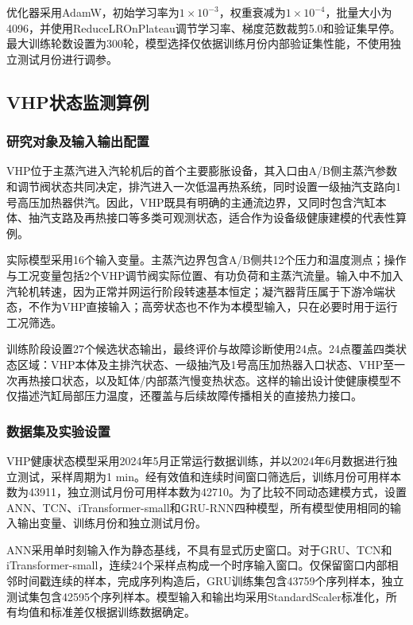 优化器采用AdamW，初始学习率为$1\times10^{-3}$，权重衰减为$1\times10^{-4}$，批量大小为4096，并使用ReduceLROnPlateau调节学习率、梯度范数裁剪5.0和验证集早停。最大训练轮数设置为300轮，模型选择仅依据训练月份内部验证集性能，不使用独立测试月份进行调参。

\subsection{VHP状态监测算例}
\label{subsec:vhp_case_v4}

\subsubsection{研究对象及输入输出配置}

VHP位于主蒸汽进入汽轮机后的首个主要膨胀设备，其入口由A/B侧主蒸汽参数和调节阀状态共同决定，排汽进入一次低温再热系统，同时设置一级抽汽支路向1号高压加热器供汽。因此，VHP既具有明确的主通流边界，又同时包含汽缸本体、抽汽支路及再热接口等多类可观测状态，适合作为设备级健康建模的代表性算例。

实际模型采用16个输入变量。主蒸汽边界包含A/B侧共12个压力和温度测点；操作与工况变量包括2个VHP调节阀实际位置、有功负荷和主蒸汽流量。输入中不加入汽轮机转速，因为正常并网运行阶段转速基本恒定；凝汽器背压属于下游冷端状态，不作为VHP直接输入；高旁状态也不作为本模型输入，只在必要时用于运行工况筛选。

训练阶段设置27个候选状态输出，最终评价与故障诊断使用24点。24点覆盖四类状态区域：VHP本体及主排汽状态、一级抽汽及1号高压加热器入口状态、VHP至一次再热接口状态，以及缸体/内部蒸汽慢变热状态。这样的输出设计使健康模型不仅描述汽缸局部压力温度，还覆盖与后续故障传播相关的直接热力接口。

\subsubsection{数据集及实验设置}

VHP健康状态模型采用2024年5月正常运行数据训练，并以2024年6月数据进行独立测试，采样周期为1 min。经有效值和连续时间窗口筛选后，训练月份可用样本数为43911，独立测试月份可用样本数为42710。为了比较不同动态建模方式，设置ANN、TCN、iTransformer-small和GRU-RNN四种模型，所有模型使用相同的输入输出变量、训练月份和独立测试月份。

ANN采用单时刻输入作为静态基线，不具有显式历史窗口。对于GRU、TCN和iTransformer-small，连续24个采样点构成一个时序输入窗口。仅保留窗口内部相邻时间戳连续的样本，完成序列构造后，GRU训练集包含43759个序列样本，独立测试集包含42595个序列样本。模型输入和输出均采用StandardScaler标准化，所有均值和标准差仅根据训练数据确定。


